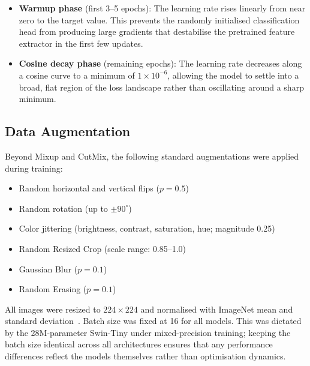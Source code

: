 \begin{itemize}
    \item \textbf{Warmup phase} (first 3--5 epochs): The learning rate rises linearly from near zero to the target value. This prevents the randomly initialised classification head from producing large gradients that destabilise the pretrained feature extractor in the first few updates.
    \item \textbf{Cosine decay phase} (remaining epochs): The learning rate decreases along a cosine curve to a minimum of $1 \times 10^{-6}$, allowing the model to settle into a broad, flat region of the loss landscape rather than oscillating around a sharp minimum.
\end{itemize}

\subsection{Data Augmentation}

Beyond Mixup and CutMix, the following standard augmentations were applied during training:
\begin{itemize}
    \item Random horizontal and vertical flips ($p=0.5$)
    \item Random rotation (up to $\pm90^\circ$)
    \item Color jittering (brightness, contrast, saturation, hue; magnitude 0.25)
    \item Random Resized Crop (scale range: 0.85--1.0)
    \item Gaussian Blur ($p=0.1$)
    \item Random Erasing ($p=0.1$)
\end{itemize}

All images were resized to $224 \times 224$ and normalised with ImageNet mean and standard deviation~\cite{deng2009imagenet}. Batch size was fixed at 16 for all models. This was dictated by the 28M-parameter Swin-Tiny under mixed-precision training; keeping the batch size identical across all architectures ensures that any performance differences reflect the models themselves rather than optimisation dynamics.

